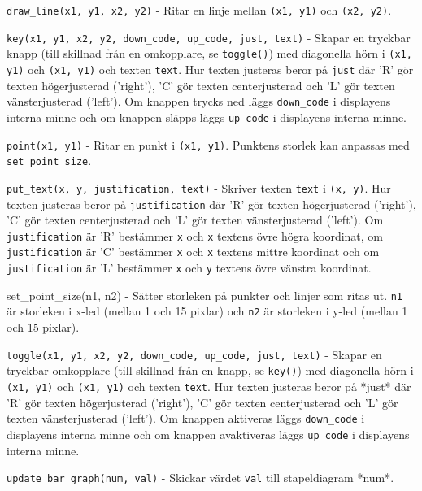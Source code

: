 \texttt{draw\_line(x1, y1, x2, y2)} - Ritar en linje mellan \texttt{(x1, y1)} och
\texttt{(x2, y2)}.

\texttt{key(x1, y1, x2, y2, down\_code, up\_code, just, text)} - Skapar en
tryckbar knapp (till skillnad från en omkopplare, se \texttt{toggle()}) med
diagonella hörn i \texttt{(x1, y1)} och \texttt{(x1, y1)} och texten \texttt{text}. Hur
texten justeras beror på \texttt{just} där 'R' gör texten högerjusterad ('right'), 'C'
gör texten centerjusterad och 'L' gör texten vänsterjusterad ('left'). Om
knappen trycks ned läggs \texttt{down\_code} i displayens interna minne och om knappen
släpps läggs \texttt{up\_code} i displayens interna minne.

\texttt{point(x1, y1)} - Ritar en punkt i \texttt{(x1, y1)}. Punktens storlek kan
anpassas med \texttt{set\_point\_size}.

\texttt{put\_text(x, y, justification, text)} - Skriver texten \texttt{text} i
\texttt{(x, y)}. Hur texten justeras beror på \texttt{justification} där 'R' gör
texten högerjusterad ('right'), 'C' gör texten centerjusterad och 'L' gör texten
vänsterjusterad ('left'). Om \texttt{justification} är 'R' bestämmer \texttt{x}
och \texttt{x} textens övre högra koordinat, om \texttt{justification} är 'C'
bestämmer \texttt{x} och \texttt{x} textens mittre koordinat och om
\texttt{justification} är 'L' bestämmer \texttt{x} och \texttt{y} textens övre
vänstra koordinat.

set\_point\_size(n1, n2) - Sätter storleken på punkter och linjer som ritas ut.
\texttt{n1} är storleken i x-led (mellan 1 och 15 pixlar) och \texttt{n2} är
storleken i y-led (mellan 1 och 15 pixlar).

\texttt{toggle(x1, y1, x2, y2, down\_code, up\_code, just, text)} - Skapar en
tryckbar omkopplare (till skillnad från en knapp, se \texttt{key()}) med
diagonella hörn i \texttt{(x1, y1)} och \texttt{(x1, y1)} och texten
\texttt{text}. Hur texten justeras beror på *just* där 'R' gör texten
högerjusterad ('right'), 'C' gör texten centerjusterad och 'L' gör texten
vänsterjusterad ('left'). Om knappen aktiveras läggs \texttt{down\_code} i
displayens interna minne och om knappen avaktiveras läggs \texttt{up\_code} i
displayens interna minne.

\texttt{update\_bar\_graph(num, val)} - Skickar värdet \texttt{val} till
stapeldiagram *num*.
